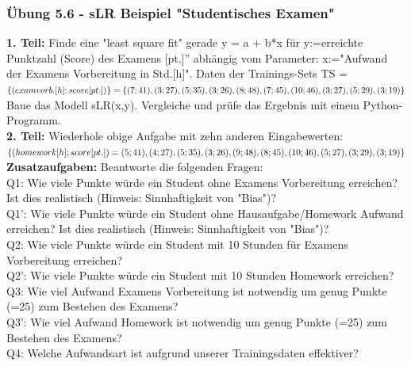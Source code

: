 \documentclass[12pt]{article}
\begin{document}
\subsubsection{Übung 5.6 - sLR Beispiel "Studentisches Examen"}
%								
\textbf{1. Teil:} Finde eine "least square fit" gerade  y = a + b*x für y:=erreichte Punktzahl (Score) des Examens [pt.]” abhängig vom Parameter: x:="Aufwand der Examens Vorbereitung in Std.[h]". Daten der Trainings-Sets TS  = $ \lbrace (exam vorb.[h]; score[pt.])\rbrace \\
= \lbrace(7;41 ),(3;27), (5;35), (3;26), (8;48), (7;45), (10;46), (3;27), (5;29), (3;19)\rbrace $ \\
Baue das Modell sLR(x,y). Vergleiche und prüfe das Ergebnis mit einem Python-Programm.\\[0.2cm]
\textbf{2. Teil:} Wiederhole obige Aufgabe mit zehn anderen Eingabewerten: \\
 $ \lbrace (homework[h]; score[pt.])\\
= {(5; 41), (4; 27), (5; 35), (3; 26), (9; 48), (8; 45), (10; 46), (5; 27), (3; 29), (3; 19)}\rbrace $\\[0.2cm]
\textbf{Zusatzaufgaben:} Beantworte die folgenden Fragen:\\ 
Q1: Wie viele Punkte würde ein Student ohne Examens Vorbereitung erreichen? Ist dies realistisch (Hinweis: Sinnhaftigkeit von "Bias")?\\
Q1': Wie viele Punkte würde ein Student ohne Hausaufgabe/Homework Aufwand erreichen? Ist dies realistisch (Hinweis: Sinnhaftigkeit von "Bias")?\\
Q2: Wie viele Punkte würde ein Student mit 10 Stunden für Examens Vorbereitung  erreichen? \\ 
Q2': Wie viele Punkte würde ein Student mit 10 Stunden Homework erreichen? \\ 
Q3: Wie viel Aufwand Examens Vorbereitung ist notwendig um genug Punkte (=25) zum Bestehen des Examens?\\
Q3': Wie viel Aufwand Homework ist notwendig um genug Punkte (=25) zum Bestehen des Examens?\\
Q4: Welche Aufwandsart ist aufgrund unserer Trainingsdaten effektiver?\\ 
\end{document}
